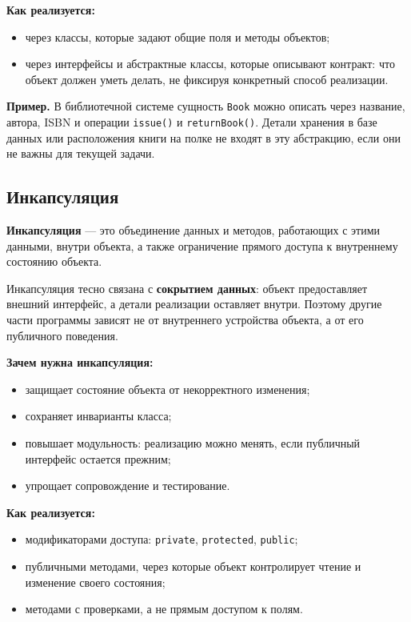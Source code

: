 \textbf{Как реализуется:}
\begin{itemize}
    \item через классы, которые задают общие поля и методы объектов;
    \item через интерфейсы и абстрактные классы, которые описывают контракт: что объект должен уметь делать, не фиксируя конкретный способ реализации.
\end{itemize}

\textbf{Пример.} В библиотечной системе сущность \texttt{Book} можно описать через название, автора, ISBN и операции \texttt{issue()} и \texttt{returnBook()}. Детали хранения в базе данных или расположения книги на полке не входят в эту абстракцию, если они не важны для текущей задачи.

\subsection*{Инкапсуляция}

\textbf{Инкапсуляция} --- это объединение данных и методов, работающих с этими данными, внутри объекта, а также ограничение прямого доступа к внутреннему состоянию объекта.

Инкапсуляция тесно связана с \textbf{сокрытием данных}: объект предоставляет внешний интерфейс, а детали реализации оставляет внутри. Поэтому другие части программы зависят не от внутреннего устройства объекта, а от его публичного поведения.

\textbf{Зачем нужна инкапсуляция:}
\begin{itemize}
    \item защищает состояние объекта от некорректного изменения;
    \item сохраняет инварианты класса;
    \item повышает модульность: реализацию можно менять, если публичный интерфейс остается прежним;
    \item упрощает сопровождение и тестирование.
\end{itemize}

\textbf{Как реализуется:}
\begin{itemize}
    \item модификаторами доступа: \texttt{private}, \texttt{protected}, \texttt{public};
    \item публичными методами, через которые объект контролирует чтение и изменение своего состояния;
    \item методами с проверками, а не прямым доступом к полям.
\end{itemize}

